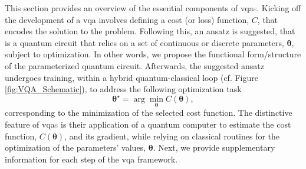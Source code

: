 This section provides an overview of the essential components of \acrshort{vqa}\textcolor{gray}{s}. Kicking off the development of a \acrshort{vqa} involves defining a cost (or loss) function, $C$, that encodes the solution to the problem. Following this, an ansatz is suggested, that is a quantum circuit that relies on a set of continuous or discrete parameters, $\boldsymbol{\theta}$, subject to optimization. In other words, we propose the functional form/structure of the parameterized quantum circuit. Afterwards, the suggested ansatz undergoes training, within a hybrid quantum-classical loop (cf. Figure \ref{fig:VQA_Schematic}), to address the following optimization task
\begin{equation}\label{eq:Optimization}
  \boldsymbol{\theta}^{\star} = \arg \min_{\boldsymbol{\theta}} C(\boldsymbol{\theta}),
\end{equation}
corresponding to the minimization of the selected cost function. The distinctive feature of \acrshort{vqa}\textcolor{gray}{s} is their application of a quantum computer to estimate the cost function, $C(\boldsymbol{\theta})$, and its gradient, while relying on classical routines for the optimization of the parameters' values, $\boldsymbol{\theta}$. Next, we provide supplementary information for each step of the \acrshort{vqa} framework.


